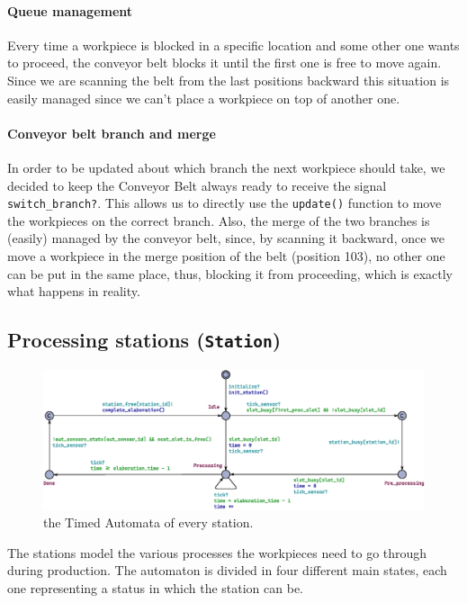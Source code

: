 \documentclass[a4paper,twoside]{article}
\begin{document}
    \paragraph{Queue management} Every time a workpiece is blocked in a specific location and some other one wants to proceed, the conveyor belt blocks it until the first one is free to move again. Since we are scanning the belt from the last positions backward this situation is easily managed since we can't place a workpiece on top of another one.

    \paragraph{Conveyor belt branch and merge} In order to be updated about which branch the next workpiece should take, we decided to keep the Conveyor Belt always ready to receive the signal \texttt{switch\_branch?}. This allows us to directly use the \texttt{update()} function to move the workpieces on the correct branch. Also, the merge of the two branches is (easily) managed by the conveyor belt, since, by scanning it backward, once we move a workpiece in the merge position of the belt (position 103), no other one can be put in the same place, thus, blocking it from proceeding, which is exactly what happens in reality.

    \subsection{Processing stations (\texttt{Station})}

    \begin{figure}[h!]
        \centering
        \includegraphics[width=\columnwidth]{./images/automata/station}
        \caption{the Timed Automata of every station.}
    \end{figure}

    The stations model the various processes the workpieces need to go through during production. The automaton is divided in four different main states, each one representing a status in which the station can be.
\end{document}
